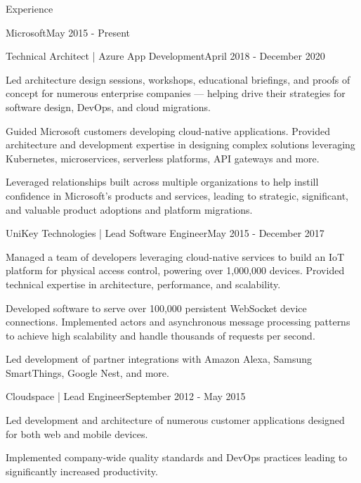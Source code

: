 \documentclass{resume} %
\begin{document}
\begin{rSection}{Experience}
\begin{rSubsection}{Microsoft}{May 2015 - Present}{}{}
\begin{rSubSubsection}{Technical Architect | Azure App Development}{April 2018 - December 2020}{}{}
        \item Led architecture design sessions, workshops, educational briefings, and proofs of concept for numerous enterprise companies --- helping drive their strategies for software design, DevOps, and cloud migrations.
        \item Guided Microsoft customers developing cloud-native applications.  Provided architecture and development expertise in designing complex solutions leveraging Kubernetes, microservices, serverless platforms, API gateways and more.
        \item Leveraged relationships built across multiple organizations to help instill confidence in Microsoft's products and services, leading to strategic, significant, and valuable product adoptions and platform migrations.
        
    \end{rSubSubsection}
    
    
\end{rSubsection}


\begin{rSubsection}{UniKey Technologies | Lead Software Engineer}{May 2015 - December 2017}{}{}

\item Managed a team of developers leveraging cloud-native services to build an IoT platform for physical access control, powering over 1,000,000 devices.  Provided technical expertise in architecture, performance, and scalability.
\item Developed software to serve over 100,000 persistent WebSocket device connections. Implemented actors and asynchronous message processing patterns to achieve high scalability and handle thousands of requests per second.
\item Led development of partner integrations with Amazon Alexa, Samsung SmartThings, Google Nest, and more.

\end{rSubsection}


\begin{rSubsection}{Cloudspace | Lead Engineer}{September 2012 - May 2015}{}{}

\item Led development and architecture of numerous customer applications designed for both web and mobile devices.
\item Implemented company-wide quality standards and DevOps practices leading to significantly increased productivity.
    

\end{rSubsection}
\end{rSection}
\end{document}
